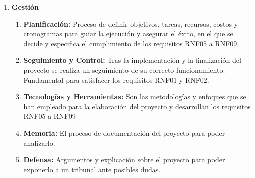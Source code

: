 \begin{enumerate}
    \item \textbf{Gestión}
          \setcounter{enumii}{0} %
          \begin{enumerate}
              \item \textbf{Planificación: } Proceso de definir objetivos, tareas, recursos, costos y cronogramas para guiar la ejecución y asegurar el éxito, en el que se decide y especifica el cumplimiento de los requisitos RNF05 a RNF09.
              \item  \textbf{Seguimiento y Control: }Tras la implementación y la finalización del proyecto se realiza un seguimiento de su correcto funcionamiento. Fundamental para satisfacer los requisitos RNF01 y RNF02.
              \item \textbf{Tecnologías y Herramientas: } Son las metodologías y enfoques que se han empleado para la elaboración del proyecto y desarrollan los requisitos RNF05 a RNF09
              \item \textbf{Memoria:} El proceso de documentación del proyecto para poder analizarlo.
              \item \textbf{Defensa:} Argumentos y explicación sobre el proyecto para poder exponerlo a un tribunal ante posibles dudas.
          \end{enumerate}


\end{enumerate}
